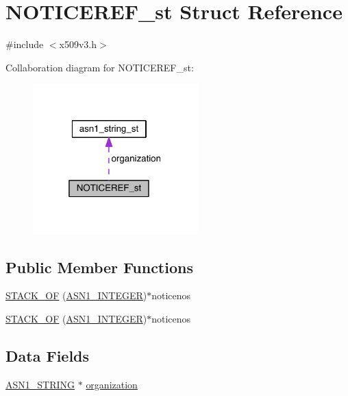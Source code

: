 \hypertarget{struct_n_o_t_i_c_e_r_e_f__st}{}\section{N\+O\+T\+I\+C\+E\+R\+E\+F\+\_\+st Struct Reference}
\label{struct_n_o_t_i_c_e_r_e_f__st}


{\ttfamily \#include $<$x509v3.\+h$>$}



Collaboration diagram for N\+O\+T\+I\+C\+E\+R\+E\+F\+\_\+st\+:\nopagebreak
\begin{figure}[H]
\begin{center}
\leavevmode
\includegraphics[width=181pt]{struct_n_o_t_i_c_e_r_e_f__st__coll__graph}
\end{center}
\end{figure}
\subsection*{Public Member Functions}
\begin{DoxyCompactItemize}
\item 
\hyperlink{struct_n_o_t_i_c_e_r_e_f__st_a2ee32b30bf7912c3bce8dd5cccab04b7}{S\+T\+A\+C\+K\+\_\+\+OF} (\hyperlink{crypto_2ossl__typ_8h_af4335399bf9774cb410a5e93de65998b}{A\+S\+N1\+\_\+\+I\+N\+T\+E\+G\+ER})$\ast$noticenos
\item 
\hyperlink{struct_n_o_t_i_c_e_r_e_f__st_a2ee32b30bf7912c3bce8dd5cccab04b7}{S\+T\+A\+C\+K\+\_\+\+OF} (\hyperlink{crypto_2ossl__typ_8h_af4335399bf9774cb410a5e93de65998b}{A\+S\+N1\+\_\+\+I\+N\+T\+E\+G\+ER})$\ast$noticenos
\end{DoxyCompactItemize}
\subsection*{Data Fields}
\begin{DoxyCompactItemize}
\item 
\hyperlink{crypto_2ossl__typ_8h_ad37610875e38aa6c59f5e6e0b437e65c}{A\+S\+N1\+\_\+\+S\+T\+R\+I\+NG} $\ast$ \hyperlink{struct_n_o_t_i_c_e_r_e_f__st_a12e16c71ac4aa63829eb2dd1d012fe7a}{organization}
\end{DoxyCompactItemize}


